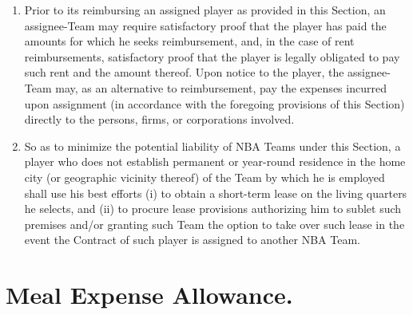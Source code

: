 \documentclass[
]{book}
\begin{document}
\begin{enumerate}
\item
  Prior to its reimbursing an assigned player as provided in this Section, an assignee-Team may require satisfactory proof that the player has paid the amounts for which he seeks reimbursement, and, in the case of rent reimbursements, satisfactory proof that the player is legally obligated to pay such rent and the amount thereof. Upon notice to the player, the assignee-Team may, as an alternative to reimbursement, pay the expenses incurred upon assignment (in accordance with the foregoing provisions of this Section) directly to the persons, firms, or corporations involved.
\item
  So as to minimize the potential liability of NBA Teams under this Section, a player who does not establish permanent or year-round residence in the home city (or geographic vicinity thereof) of the Team by which he is employed shall use his best efforts (i) to obtain a short-term lease on the living quarters he selects, and (ii) to procure lease provisions authorizing him to sublet such premises and/or granting such Team the option to take over such lease in the event the Contract of such player is assigned to another NBA Team.
\end{enumerate}

\hypertarget{meal-expense-allowance.}{%
\section{Meal Expense Allowance.}\label{meal-expense-allowance.}}
\end{document}
